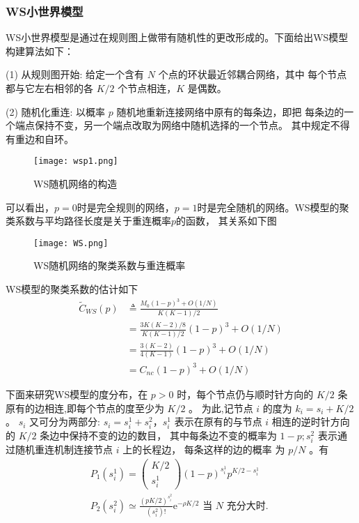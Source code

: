 \subsubsection{WS小世界模型}
WS小世界模型是通过在规则图上做带有随机性的更改形成的。下面给出WS模型构建算法如下：\par
\noindent(1) 从规则图开始: 给定一个含有 $N$ 个点的环状最近邻耦合网络，其中 每个节点都与它左右相邻的各 $K / 2$ 个节点相连，$K$ 是偶数。\par
\noindent(2) 随机化重连: 以概率 $p$ 随机地重新连接网络中原有的每条边，即把 每条边的一个端点保持不变，另一个端点改取为网络中随机选择的一个节点。
其中规定不得有重边和自环。\par
\begin{figure}[!htbp]
    \centering
    \texttt{[image: wsp1.png]}
    \caption{WS随机网络的构造}
\end{figure}
可以看出，$p=0$时是完全规则的网络，$p=1$时是完全随机的网络。WS模型的聚类系数与平均路径长度是关于重连概率$p$的函数，
其关系如下图\par
\begin{figure}[!htbp]
    \centering
    \texttt{[image: WS.png]}
    \caption{WS随机网络的聚类系数与重连概率}
\end{figure}
WS模型的聚类系数的估计如下
\begin{equation}
    \begin{aligned}
    \tilde{C}_{W S}(p) & \triangleq \frac{M_0(1-p)^3+O(1 / N)}{K(K-1) / 2} \\
    & =\frac{3 K(K-2) / 8}{K(K-1) / 2}(1-p)^3+O(1 / N) \\
    & =\frac{3(K-2)}{4(K-1)}(1-p)^3+O(1 / N) \\
    & =C_{n c}(1-p)^3+O(1 / N)
    \end{aligned}
\end{equation}\par
下面来研究WS模型的度分布，在 $p>0$ 时，每个节点仍与顺时针方向的 $K / 2$ 条原有的边相连,即每个节点的度至少为 $K / 2$ 。
 为此,记节点 $i$ 的度为 $k_i=s_i+K / 2$。 $s_i$ 又可分为两部分: 
 $s_i=s_i^1+s_i^2$，$s_i^1$ 表示在原有的与节点 $i$ 相连的逆时针方向的 $K / 2$ 条边中保持不变的边的数目，
 其中每条边不变的概率为 $1-p ; s_i^2$ 表示通过随机重连机制连接节点 $i$ 上的长程边，
 每条这样的边的概率 为 $p / N$ 。有
 \begin{equation}
    \begin{gathered}
    P_1\left(s_i^1\right)=\left(\begin{array}{c}
    K / 2 \\
    s_i^1
    \end{array}\right)(1-p)^{s_i^{1}} p^{K / 2-s_i^1}\\
    P_2\left(s_i^2\right) \simeq \frac{(p K / 2)^{s_i^2}}{\left(s_i^2\right) !} \mathrm{e}^{-\rho K / 2}\text { 当 } N \text { 充分大时. }
    \end{gathered}
\end{equation}
